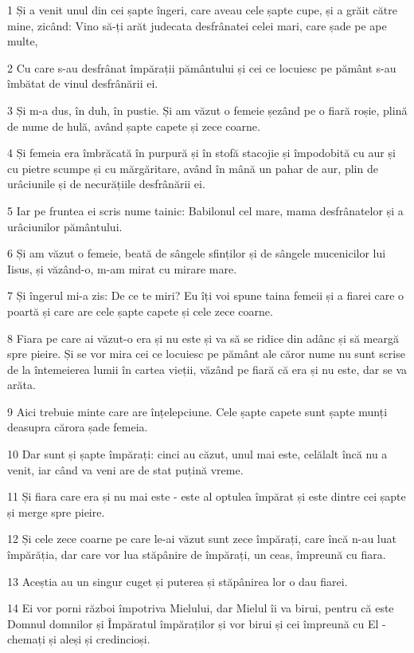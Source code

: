 \par 1 Și a venit unul din cei șapte îngeri, care aveau cele șapte cupe, și a grăit către mine, zicând: Vino să-ți arăt judecata desfrânatei celei mari, care șade pe ape multe,
\par 2 Cu care s-au desfrânat împărații pământului și cei ce locuiesc pe pământ s-au îmbătat de vinul desfrânării ei.
\par 3 Și m-a dus, în duh, în pustie. Și am văzut o femeie șezând pe o fiară roșie, plină de nume de hulă, având șapte capete și zece coarne.
\par 4 Și femeia era îmbrăcată în purpură și în stofă stacojie și împodobită cu aur și cu pietre scumpe și cu mărgăritare, având în mână un pahar de aur, plin de urâciunile și de necurățiile desfrânării ei.
\par 5 Iar pe fruntea ei scris nume tainic: Babilonul cel mare, mama desfrânatelor și a urâciunilor pământului.
\par 6 Și am văzut o femeie, beată de sângele sfinților și de sângele mucenicilor lui Iisus, și văzând-o, m-am mirat cu mirare mare.
\par 7 Și îngerul mi-a zis: De ce te miri? Eu îți voi spune taina femeii și a fiarei care o poartă și care are cele șapte capete și cele zece coarne.
\par 8 Fiara pe care ai văzut-o era și nu este și va să se ridice din adânc și să meargă spre pieire. Și se vor mira cei ce locuiesc pe pământ ale căror nume nu sunt scrise de la întemeierea lumii în cartea vieții, văzând pe fiară că era și nu este, dar se va arăta.
\par 9 Aici trebuie minte care are înțelepciune. Cele șapte capete sunt șapte munți deasupra cărora șade femeia.
\par 10 Dar sunt și șapte împărați: cinci au căzut, unul mai este, celălalt încă nu a venit, iar când va veni are de stat puțină vreme.
\par 11 Și fiara care era și nu mai este - este al optulea împărat și este dintre cei șapte și merge spre pieire.
\par 12 Și cele zece coarne pe care le-ai văzut sunt zece împărați, care încă n-au luat împărăția, dar care vor lua stăpânire de împărați, un ceas, împreună cu fiara.
\par 13 Aceștia au un singur cuget și puterea și stăpânirea lor o dau fiarei.
\par 14 Ei vor porni război împotriva Mielului, dar Mielul îi va birui, pentru că este Domnul domnilor și Împăratul împăraților și vor birui și cei împreună cu El - chemați și aleși și credincioși.
